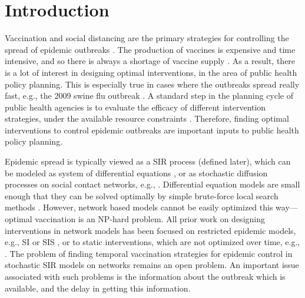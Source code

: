 \section{Introduction}
\label{sec:intro}

Vaccination and social distancing are the primary strategies for controlling the spread of epidemic outbreaks
\cite{medlock:science09,Ogura2017,halloran:pnas08,lofgren:pnas14,zhang2015controlling,YaoSDM2014,AAAI1816714,PreciadoVM13_2,PreciadoVM13,PreciadoVM14,Aspnes:2005}.
The production of vaccines is expensive and time intensive, and so there is always a shortage of
vaccine supply \cite{cdc:temporal}. As a result, there is a lot of interest in designing optimal interventions,
in the area of public health policy planning. This is especially true in cases where the outbreaks spread
really fast, e.g., the 2009 swine flu outbreak \cite{medlock:science09}. 
A standard step in the planning cycle of public health agencies is to evaluate the efficacy of different
intervention strategies, under the available resource constraints \cite{halloran:pnas08,lofgren:pnas14}.
Therefore, finding optimal interventions to control epidemic outbreaks are important inputs to
public health policy planning.

Epidemic spread is typically viewed as a SIR process (defined later), which can be
modeled as system of differential equations \cite{medlock:science09,AAAI1816714,venkataramanan:ichi17}, or as stochastic
diffusion processes on social contact networks, e.g., \cite{marathe:cacm13}.
Differential equation models are small enough that they can be solved optimally by simple brute-force
local search methods \cite{medlock:science09}.
However, network based models cannot be easily optimized this way---optimal vaccination is an NP-hard problem.
All prior work on designing interventions in network models has been focused on restricted epidemic models, e.g., SI or SIS \cite{Aspnes:2005,PreciadoVM13_2,PreciadoVM13,PreciadoVM14,SahaSDM15,Ogura2017},
or to static interventions, which are not optimized over time, e.g., \cite{zhang2015controlling,YaoSDM2014}. 
The problem of finding temporal vaccination strategies for epidemic control in stochastic SIR models on networks remains an open problem. An important issue associated with such problems is the information about the outbreak which is available, and the delay in getting this information.




